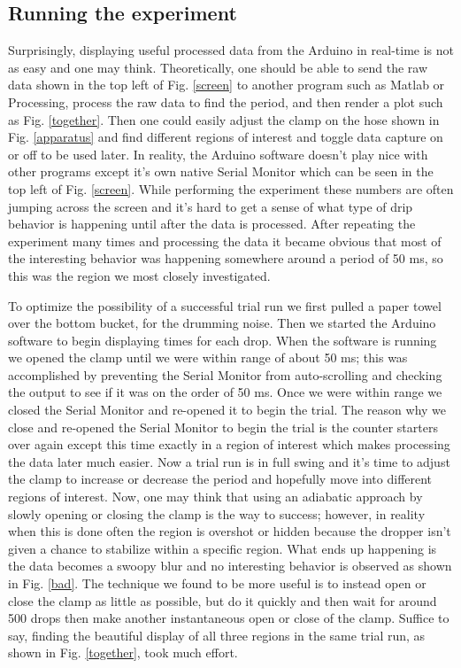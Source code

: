 \documentclass[11pt]{article}
\begin{document}
\subsection{Running the experiment}
Surprisingly, displaying useful processed data from the Arduino in real-time is not as easy and one may think. Theoretically, one should be able to send the raw data shown in the top left of Fig. \ref {screen}  to another program such as Matlab or Processing, process the raw data to find the period, and then render a plot such as Fig. \ref{together}. Then one could easily adjust the clamp on the hose shown in Fig. \ref{apparatus} and find different regions of interest and toggle data capture on or off to be used later. In reality, the Arduino software doesn't play nice with other programs except it's own native Serial Monitor which can be seen in the top left of Fig. \ref{screen}. While performing the experiment these numbers are often jumping across the screen and it's hard to get a sense of what type of drip behavior is happening until after the data is processed. After repeating the experiment many times and processing the data it became obvious that most of the interesting behavior was happening somewhere around a period of 50 ms, so this was the region we most closely investigated.

To optimize the possibility of a successful trial run we first pulled a paper towel over the bottom bucket, for the drumming noise. Then we started the Arduino software to begin displaying times for each drop. When the software is running we opened the clamp until we were within range of about 50 ms; this was accomplished by preventing the Serial Monitor from auto-scrolling and checking the output to see if it was on the order of 50 ms. Once we were within range we closed the Serial Monitor and re-opened it to begin the trial. The reason why we close and re-opened the Serial Monitor to begin the trial is the counter starters over again except this time exactly in a region of interest which makes processing the data later much easier. Now a trial run is in full swing and it's time to adjust the clamp to increase or decrease the period and hopefully move into different regions of interest. Now, one may think that using an adiabatic approach by slowly opening or closing the clamp is the way to success; however, in reality when this is done often the region is overshot or hidden because the dropper isn't given a chance to stabilize within a specific region. What ends up happening is the data becomes a swoopy blur and no interesting behavior is observed as shown in Fig. \ref{bad}. The technique we found to be more useful is to instead open or close the clamp as little as possible, but do it quickly and then wait for around 500 drops then make another instantaneous open or close of the clamp. Suffice to say, finding the beautiful display of all three regions in the same trial run, as shown in Fig. \ref{together}, took much effort.
\end{document}
